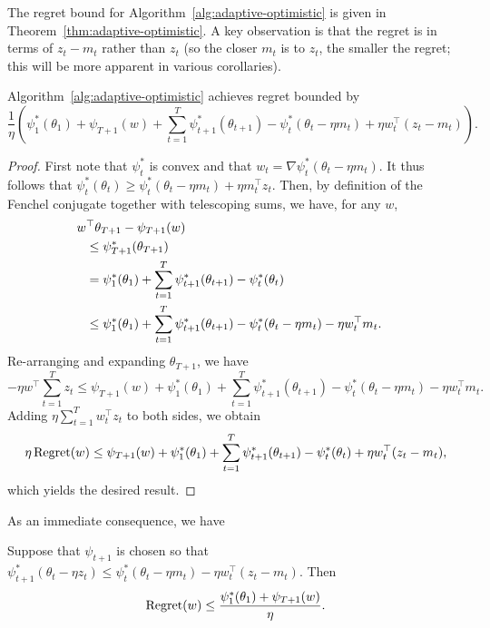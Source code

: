 \documentclass[paper_icml.tex]{subfiles}
\begin{document}
The regret bound for Algorithm~\ref{alg:adaptive-optimistic} is 
given in Theorem~\ref{thm:adaptive-optimistic}. A key observation is that 
the regret is in terms of $z_t - m_t$ rather than $z_t$ (so the closer 
$m_t$ is to $z_t$, the smaller the regret; this will be more apparent 
in various corollaries).
\begin{theorem}
\label{thm:adaptive-optimistic}
Algorithm~\ref{alg:adaptive-optimistic} achieves regret bounded by
\begin{dmath}
\label{eqn:regret-1}
\frac{1}{\eta}\left(\psi_1^*(\theta_1) + \psi_{T+1}(w) + \sum_{t=1}^{T} \psi_{t+1}^*(\theta_{t+1}) - \psi_t^*(\theta_t - \eta m_t) + \eta w_t^{\top}(z_t-m_t)\right).
\end{dmath}
\end{theorem}
\begin{proof}
First note that $\psi_t^*$ is convex and that 
$w_t = \nabla \psi_t^*(\theta_t - \eta m_t)$. It thus follows that 
$\psi_t^*(\theta_t) \geq \psi_t^*(\theta_t - \eta m_t) + \eta m_t^{\top}z_t$. 
Then, by definition of the Fenchel conjugate together with telescoping sums, we 
have, for any $w$, 
\begin{align*}
\lefteqn{\hskip -0.1in w^{\top}\theta_{T+1} - \psi_{T+1}(w)} \\
\hskip 0.1in  &\leq \psi_{T+1}^*(\theta_{T+1}) \\
  &= \psi_1^*(\theta_1) + \sum_{t=1}^{T} \psi_{t+1}^*(\theta_{t+1}) - \psi_t^*(\theta_t) \\
  &\leq \psi_1^*(\theta_1) + \sum_{t=1}^{T} \psi_{t+1}^*(\theta_{t+1}) - \psi_t^*(\theta_t-\eta m_t) - \eta w_t^{\top}m_t.
\end{align*}
Re-arranging and expanding $\theta_{T+1}$, we have
\begin{dmath}
-\eta w^{\top} \sum_{t=1}^T z_t \leq \psi_{T+1}(w) + \psi_1^*(\theta_1) + \sum_{t=1}^{T} \psi_{t+1}^*(\theta_{t+1}) - \psi_t^*(\theta_t-\eta m_t) - \eta w_t^{\top}m_t.
\end{dmath}
Adding $\eta \sum_{t=1}^T w_t^{\top}z_t$ to both sides, we obtain
\begin{dmath}
\eta \Regret(w) \leq \psi_{T+1}(w) + \psi_1^*(\theta_1) + \sum_{t=1}^T \psi_{t+1}^*(\theta_{t+1}) - \psi_t^*(\theta_t) + \eta w_t^{\top}(z_t-m_t),
\end{dmath}
which yields the desired result.
\end{proof}
As an immediate consequence, we have
\begin{corollary}
\label{cor:a-o1}
Suppose that $\psi_{t+1}$ is chosen so that $\psi_{t+1}^*(\theta_t - \eta z_t) \leq \psi_t^*(\theta_t - \eta m_t) - \eta w_t^{\top}(z_t - m_t)$. Then
\begin{equation}
\operatorname{Regret}(w) \leq \frac{\psi_1^*(\theta_1) + \psi_{T+1}(w)}{\eta}.
\end{equation}
\end{corollary}
\end{document}
